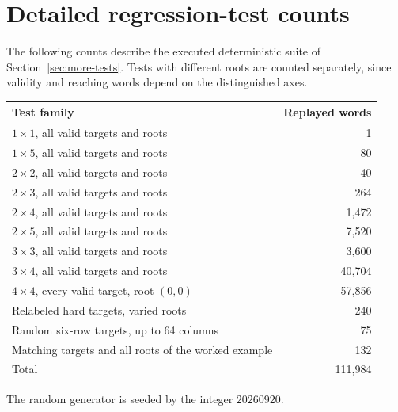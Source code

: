 \documentclass[11pt,letterpaper]{article}
\numberwithin{equation}{section}
\theoremstyle{definition}
\theoremstyle{remark}
\begin{document}
\section{Detailed regression-test counts}
\label{app:tests}
The following counts describe the executed deterministic suite of
Section~\ref{sec:more-tests}. Tests with different roots are counted
separately, since validity and reaching words depend on the distinguished
axes.
\begin{center}
\begin{tabular}{lr}
\toprule
Test family & Replayed words\\
\midrule
$1\times1$, all valid targets and roots & 1\\
$1\times5$, all valid targets and roots & 80\\
$2\times2$, all valid targets and roots & 40\\
$2\times3$, all valid targets and roots & 264\\
$2\times4$, all valid targets and roots & 1,472\\
$2\times5$, all valid targets and roots & 7,520\\
$3\times3$, all valid targets and roots & 3,600\\
$3\times4$, all valid targets and roots & 40,704\\
$4\times4$, every valid target, root $(0,0)$ & 57,856\\
Relabeled hard targets, varied roots & 240\\
Random six-row targets, up to 64 columns & 75\\
Matching targets and all roots of the worked example & 132\\
\midrule
Total & 111,984\\
\bottomrule
\end{tabular}
\end{center}
The random generator is seeded by the integer $20260920$.
\end{document}
